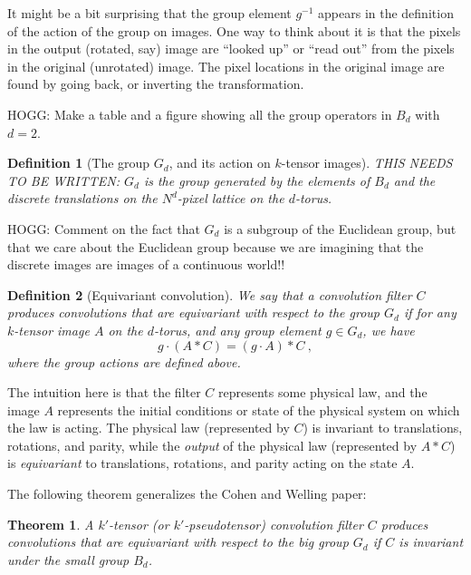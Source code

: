 \documentclass{article}
\theoremstyle{plain}
\newtheorem{definition}{Definition}
\newtheorem{theorem}{Theorem}
\begin{document}
It might be a bit surprising that the group element $g^{-1}$ appears in the definition of the action of the group on images.
One way to think about it is that the pixels in the output (rotated, say) image are ``looked up'' or ``read out'' from the pixels in the original (unrotated) image.
The pixel locations in the original image are found by going back, or inverting the transformation.

HOGG: Make a table and a figure showing all the group operators in $B_d$ with $d=2$.

\begin{definition}[The group $G_d$, and its action on $k$-tensor images]
THIS NEEDS TO BE WRITTEN: $G_d$ is the group generated by the elements of $B_d$ and the discrete translations on the $N^d$-pixel lattice on the $d$-torus.
\end{definition}

HOGG: Comment on the fact that $G_d$ is a subgroup of the Euclidean group, but that we care about the Euclidean group because we are imagining that the discrete images are images of a continuous world!!

\begin{definition}[Equivariant convolution]
We say that a convolution filter $C$ produces convolutions that are equivariant with respect to the group $G_d$ if for any $k$-tensor image $A$ on the $d$-torus, and any group element $g\in G_d$, we have
\begin{equation}
    g\cdot (A\ast C) = (g\cdot A)\ast C ~,
\end{equation}
where the group actions are defined above.
\end{definition}

The intuition here is that the filter $C$ represents some physical law, and the image $A$ represents the initial conditions or state of the physical system on which the law is acting.
The physical law (represented by $C$) is invariant to translations, rotations, and parity, while the \emph{output} of the physical law (represented by $A\ast C$) is \emph{equivariant} to translations, rotations, and parity acting on the state $A$.

The following theorem generalizes the Cohen and Welling paper:

\begin{theorem}
A $k'$-tensor (or $k'$-pseudotensor) convolution filter $C$ produces convolutions that are equivariant with respect to the big group $G_d$ if $C$ is invariant under the small group $B_d$.
\end{theorem}
\end{document}
